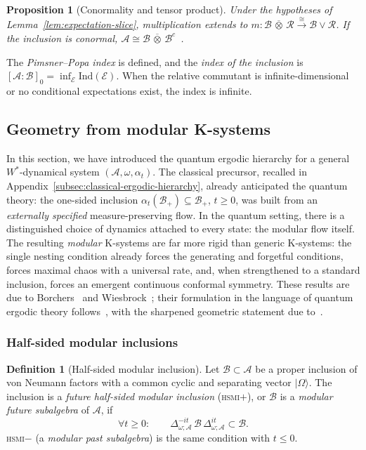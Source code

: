 \documentclass[a4paper,11pt]{article}
\newtheorem{proposition}[theorem]{Proposition}
\theoremstyle{definition}
\newtheorem{definition}{Definition}[section]
\theoremstyle{remark}
\newcommand{\mA}{\mathcal{A}}
\newcommand{\mB}{\mathcal{B}}
\newcommand{\mE}{\mathcal{E}}
\begin{document}
\begin{proposition}[Conormality and tensor product]\label{prop:conormal-factorization}
Under the hypotheses of Lemma~\ref{lem:expectation-slice}, multiplication extends to
$m:\mathcal{B}\,\overline\otimes\,\mathcal{R}\overset{\cong}{\to}\mathcal{B}\vee\mathcal{R}$.
If the inclusion is conormal, $\mathcal{A}\cong \mathcal{B}\,\overline\otimes\, \mB^c$~\cite{Faulkner2020,FaulknerSperanza2024}.
\end{proposition}
 
The \emph{Pimsner--Popa index} is defined, and the \emph{index of the inclusion} is
$[\mA:\mB]_0=\inf_\mE \mathrm{Ind}(\mE)$.  When the relative commutant is
infinite-dimensional or no conditional expectations exist, the index is infinite.
 
\subsection{Geometry from modular K-systems}
\label{subsec:geometry-K-systems}
 
In this section, we have introduced the quantum ergodic hierarchy for a general
$W^*$-dynamical system $(\mA,\omega,\alpha_t)$.  The classical precursor, recalled in
Appendix~\ref{subsec:classical-ergodic-hierarchy}, already anticipated the quantum
theory: the one-sided inclusion $\alpha_t(\mB_+)\subseteq\mB_+$, $t\ge0$, was built
from an \emph{externally specified} measure-preserving flow.  In the quantum setting,
there is a distinguished choice of dynamics attached to every state: the modular flow
itself.  The resulting \emph{modular} K-systems are far more rigid than generic
K-systems: the single nesting condition already forces the generating and forgetful
conditions, forces maximal chaos with a universal rate, and, when strengthened to a
standard inclusion, forces an emergent continuous conformal symmetry.  These results
are due to Borchers~\cite{Borchers2000} and Wiesbrock~\cite{Wiesbrock1993}; their
formulation in the language of quantum ergodic theory follows~\cite{OFLLM2024}, with
the sharpened geometric statement due to~\cite{LLMO2025}.
 
\subsubsection*{Half-sided modular inclusions}
 
\begin{definition}[Half-sided modular inclusion]\label{def:HSMI}
Let $\mB\subset\mA$ be a proper inclusion of von Neumann factors with a common cyclic
and separating vector $|\Omega\rangle$.  The inclusion is a \emph{future half-sided
modular inclusion} (\textsc{hsmi}$+$), or $\mB$ is a \emph{modular future subalgebra}
of $\mA$, if
\begin{equation}
  \forall t\ge0:\qquad
  \Delta_{\omega;\mA}^{-it}\,\mB\,\Delta_{\omega;\mA}^{it}\subset\mB.
  \label{eq:HSMI}
\end{equation}
\textsc{hsmi}$-$ (a \emph{modular past subalgebra}) is the same condition with $t\le0$.
\end{definition}
 
\end{document}
